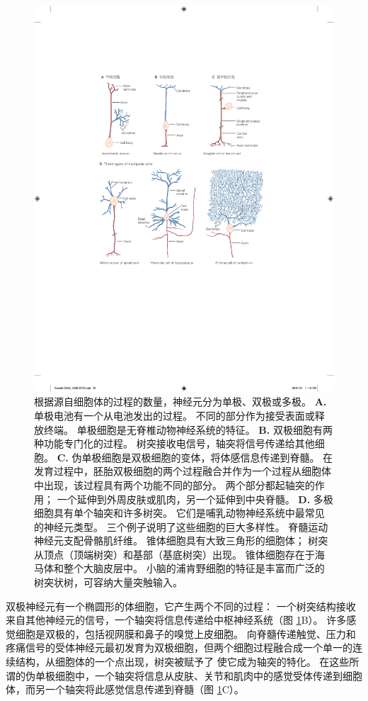\begin{figure}[htbp]
	\centering
	\includegraphics[width=0.9\linewidth]{chap03/fig_3_3}
	\caption{根据源自细胞体的过程的数量，神经元分为单极、双极或多极。 
		\textbf{A.} 单极电池有一个从电池发出的过程。 
		不同的部分作为接受表面或释放终端。 
		单极细胞是无脊椎动物神经系统的特征。 
		\textbf{B.} 双极细胞有两种功能专门化的过程。 
		树突接收电信号，轴突将信号传递给其他细胞。 
		\textbf{C.} 伪单极细胞是双极细胞的变体，将体感信息传递到脊髓。 
		在发育过程中，胚胎双极细胞的两个过程融合并作为一个过程从细胞体中出现，该过程具有两个功能不同的部分。 
		两个部分都起轴突的作用； 一个延伸到外周皮肤或肌肉，另一个延伸到中央脊髓\cite{ross2006histology}。
		\textbf{D.} 多极细胞具有单个轴突和许多树突。 
		它们是哺乳动物神经系统中最常见的神经元类型。 
		三个例子说明了这些细胞的巨大多样性。 
		脊髓运动神经元支配骨骼肌纤维。
		锥体细胞具有大致三角形的细胞体；
		树突从顶点（顶端树突）和基部（基底树突）出现。 
		锥体细胞存在于海马体和整个大脑皮层中。 
		小脑的浦肯野细胞的特征是丰富而广泛的树突状树，可容纳大量突触输入\cite{ross2006histology}。}
	\label{fig:3_3}
\end{figure}


双极神经元有一个椭圆形的体细胞，它产生两个不同的过程：
一个树突结构接收来自其他神经元的信号，一个轴突将信息传递给中枢神经系统（图 \ref{fig:3_3}B）。 
许多感觉细胞是双极的，包括视网膜和鼻子的嗅觉上皮细胞。 
向脊髓传递触觉、压力和疼痛信号的受体神经元最初发育为双极细胞，但两个细胞过程融合成一个单一的连续结构，从细胞体的一个点出现，树突被赋予了 使它成为轴突的特化。 
在这些所谓的伪单极细胞中，一个轴突将信息从皮肤、关节和肌肉中的感觉受体传递到细胞体，而另一个轴突将此感觉信息传递到脊髓（图 \ref{fig:3_3}C）。


